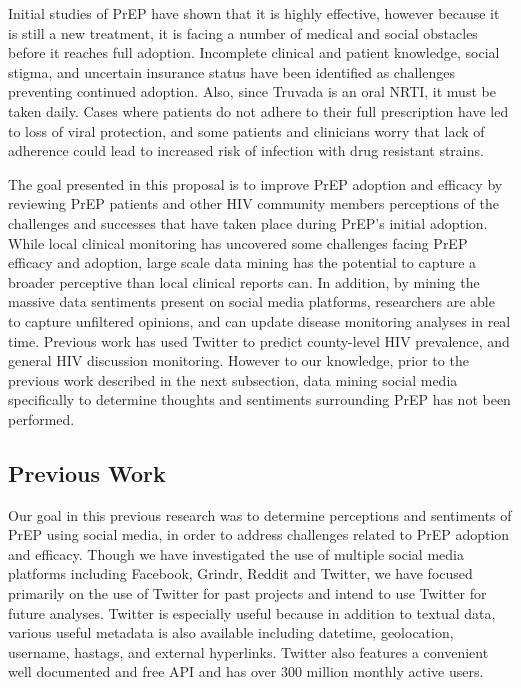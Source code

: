 Initial studies of PrEP have shown that it is highly effective\cite{golub2013efficacy}, however because it is still a new treatment, it is facing a number of medical and social obstacles before it reaches full adoption. Incomplete clinical and patient knowledge, social stigma, and uncertain insurance status have been identified as challenges preventing continued adoption\cite{calabrese2015stigma}. Also, since Truvada is an oral NRTI, it must be taken daily. Cases where patients do not adhere to their full prescription have led to loss of viral protection, and some patients and clinicians worry that lack of adherence could lead to increased risk of infection with drug resistant strains\cite{arnold2012qualitative}.

The goal presented in this proposal is to improve PrEP adoption and efficacy by reviewing PrEP patients and other HIV community members perceptions of the challenges and successes that have taken place during PrEP's initial adoption. While local clinical monitoring has uncovered some challenges facing PrEP efficacy and adoption\cite{van2013high}, large scale data mining has the potential to capture a broader perceptive than local clinical reports can. In addition, by mining the massive data sentiments present on social media platforms, researchers are able to capture unfiltered opinions, and can update disease monitoring analyses in real time. Previous work has used Twitter to predict county-level HIV prevalence\cite{young2014methods}, and general HIV discussion monitoring\cite{young2013online}. However to our knowledge, prior to the previous work described in the next subsection, data mining social media specifically to determine thoughts and sentiments surrounding PrEP has not been performed.

\subsection{Previous Work}

Our goal in this previous research was to determine perceptions and sentiments of PrEP using social media, in order to address challenges related to PrEP adoption and efficacy. Though we have investigated the use of multiple social media platforms including Facebook, Grindr, Reddit and Twitter, we have focused primarily on the use of Twitter for past projects and intend to use Twitter for future analyses. Twitter is especially useful because in addition to textual data, various useful metadata is also available including datetime, geolocation, username, hastags, and external hyperlinks. Twitter also features a convenient well documented and free API and has over 300 million monthly active users.

